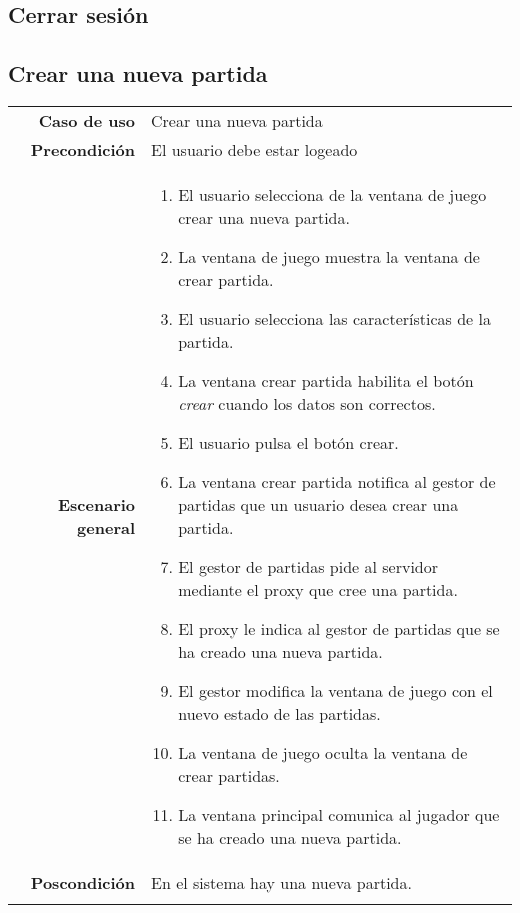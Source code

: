 \subsection{Cerrar sesión}

\subsection{Crear una nueva partida}
{\footnotesize
\begin{tabularx}{0.95\textwidth}{r|X}

\textbf{Caso de uso} & Crear una nueva partida \\

\textbf{Precondición} & El usuario debe estar logeado \\

\textbf{Escenario general} & \begin{enumerate}
\item El usuario selecciona de la ventana de juego crear una nueva partida.
\item La ventana de juego muestra la ventana de crear partida.
\item El usuario selecciona las características de la partida.
\item La ventana crear partida habilita el botón \emph{crear} cuando los datos son correctos.
\item El usuario pulsa el botón crear.
\item La ventana crear partida notifica al gestor de partidas que un usuario desea crear una partida. 
\item El gestor de partidas pide al servidor mediante el proxy que cree una partida.
\item El proxy le indica al gestor de partidas que se ha creado una nueva partida.
\item El gestor modifica la ventana de juego con el nuevo estado de las partidas.  
\item La ventana de juego oculta la ventana de crear partidas.
\item La ventana principal comunica al jugador que se ha creado una nueva partida.
\end{enumerate} \\

\textbf{Poscondición} & En el sistema hay una nueva partida.\\ \\


\end{tabularx}}
